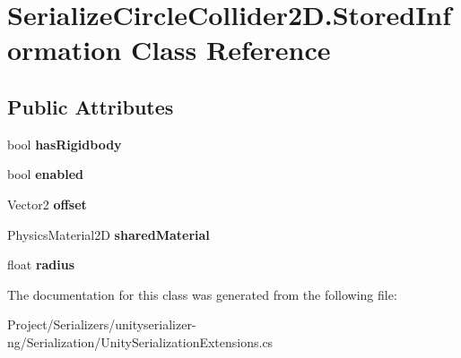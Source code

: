 \hypertarget{class_serialize_circle_collider2_d_1_1_stored_information}{}\section{Serialize\+Circle\+Collider2\+D.\+Stored\+Information Class Reference}
\label{class_serialize_circle_collider2_d_1_1_stored_information}
\subsection*{Public Attributes}
\begin{DoxyCompactItemize}
\item 
\mbox{\label{class_serialize_circle_collider2_d_1_1_stored_information_a1cd7e610e41f5d63c6c259cf139aacd3}} 
bool {\bfseries has\+Rigidbody}
\item 
\mbox{\label{class_serialize_circle_collider2_d_1_1_stored_information_a4d2a3492dd35545b1758616e3e249a88}} 
bool {\bfseries enabled}
\item 
\mbox{\label{class_serialize_circle_collider2_d_1_1_stored_information_ab1ff1327e36f3b332d36e954b2919e48}} 
Vector2 {\bfseries offset}
\item 
\mbox{\label{class_serialize_circle_collider2_d_1_1_stored_information_aa75f2d6b0105e6203a6327eb89bfc4ec}} 
Physics\+Material2D {\bfseries shared\+Material}
\item 
\mbox{\label{class_serialize_circle_collider2_d_1_1_stored_information_a1568457da8081307e12181890a36189f}} 
float {\bfseries radius}
\end{DoxyCompactItemize}


The documentation for this class was generated from the following file\+:\begin{DoxyCompactItemize}
\item 
Project/\+Serializers/unityserializer-\/ng/\+Serialization/Unity\+Serialization\+Extensions.\+cs\end{DoxyCompactItemize}
